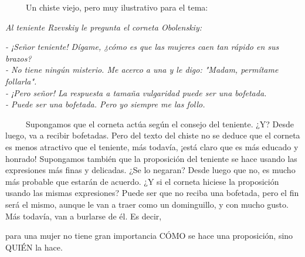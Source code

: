~ ~ ~ Un chiste viejo, pero muy ilustrativo para el tema:


\noindent
\textit{Al teniente Rzevskiy le pregunta el corneta Obolenskiy:}

\noindent
 \textit{-  ¡Señor teniente! Dígame, ¿cómo es que las mujeres caen tan rápido en sus brazos?}\\
 \textit{-  No tiene ningún misterio. Me acerco a una y le digo: "Madam, permítame follarla".}\\
 \textit{-  ¡Pero señor! La respuesta a tamaña vulgaridad puede ser una bofetada.}\\
 \textit{-  Puede ser una bofetada. Pero yo siempre me las follo.}


~ ~ ~ Supongamos que el corneta actúa según el consejo del teniente. ¿Y?
Desde luego, va a recibir bofetadas. Pero del texto del chiste no se
deduce que el corneta es menos atractivo que el teniente, más todavía,
¡está claro que es más educado y honrado! Supongamos también que la
proposición del teniente se hace usando las expresiones más finas y
delicadas. ¿Se lo negaran? Desde luego que no, es mucho más probable que
estarán de acuerdo. ¿Y si el corneta hiciese la proposición usando las
mismas expresiones? Puede ser que no reciba una bofetada, pero el fin
será el mismo, aunque le van a traer como un dominguillo, y con mucho
gusto. Más todavía, van a burlarse de él. Es decir,


\begin{tcolorbox}
 para una mujer no tiene gran importancia CÓMO se hace una proposición, sino QUIÉN la hace.
\end{tcolorbox}



